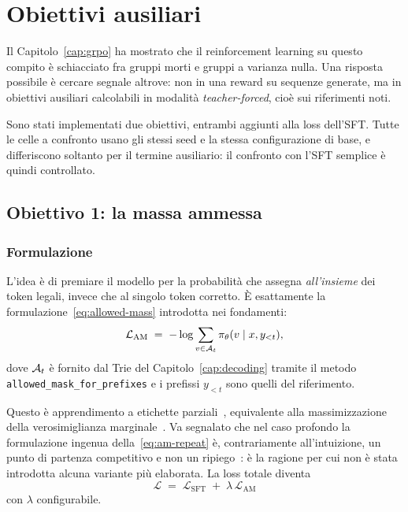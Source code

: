\chapter{Obiettivi ausiliari}
\label{cap:ausiliari}

Il Capitolo~\ref{cap:grpo} ha mostrato che il reinforcement learning su questo
compito è schiacciato fra gruppi morti e gruppi a varianza nulla. Una risposta
possibile è cercare segnale altrove: non in una reward su sequenze generate, ma
in obiettivi ausiliari calcolabili in modalità \emph{teacher-forced}, cioè sui
riferimenti noti.

Sono stati implementati due obiettivi, entrambi aggiunti alla loss dell'SFT.
Tutte le celle a confronto usano gli stessi seed e la stessa configurazione di
base, e differiscono soltanto per il termine ausiliario: il confronto con l'SFT
semplice è quindi controllato.

\section{Obiettivo 1: la massa ammessa}

\subsection{Formulazione}

L'idea è di premiare il modello per la probabilità che assegna \emph{all'insieme}
dei token legali, invece che al singolo token corretto. È esattamente la
formulazione~\eqref{eq:allowed-mass} introdotta nei fondamenti:
\begin{equation}
  \label{eq:am-repeat}
  \mathcal{L}_{\text{AM}}
  \;=\;
  -\log \sum_{v \in \mathcal{A}_t} \pi_\theta(v \mid x, y_{<t}),
\end{equation}
dove $\mathcal{A}_t$ è fornito dal Trie del Capitolo~\ref{cap:decoding} tramite il
metodo \texttt{allowed\_mask\_for\_prefixes} e i prefissi $y_{<t}$ sono quelli
del riferimento.

Questo è apprendimento a etichette parziali~\cite{cour2011partial}, equivalente
alla massimizzazione della verosimiglianza marginale~\cite{guu2017mml}. Va
segnalato che nel caso profondo la formulazione ingenua della~\eqref{eq:am-repeat}
è, contrariamente all'intuizione, un punto di partenza competitivo e non un
ripiego~\cite{seohuh2020naive}: è la ragione per cui non è stata introdotta
alcuna variante più elaborata. La loss totale diventa
\begin{equation}
  \mathcal{L} \;=\; \mathcal{L}_{\text{SFT}} \;+\; \lambda\, \mathcal{L}_{\text{AM}}
\end{equation}
con $\lambda$ configurabile.

